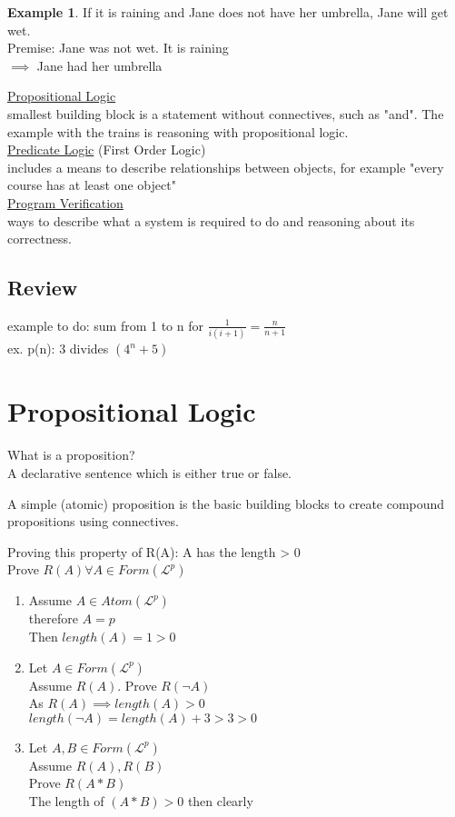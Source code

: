\documentclass[12pt,oneside,notitlepage]{book}
\theoremstyle{definition}
\newtheorem{ex}{Example}[subsection]
\newcommand{\Lp}{\mathcal{L}^p}
\begin{document}
\begin{ex}
If it is raining and Jane does not have her umbrella, Jane will get wet. \\
Premise: Jane was not wet. It is raining \\
$\implies$ Jane had her umbrella
\end{ex}

\underline{Propositional Logic} \\
smallest building block is a statement without connectives, such as "and". The example with the trains is reasoning with propositional logic. \\
\underline{Predicate Logic} (First Order Logic) \\
includes a means to describe relationships between objects, for example "every course has at least one object" \\
\underline{Program Verification} \\
ways to describe what a system is required to do and reasoning about its correctness. \\

\subsection{Review}
example to do:
sum from 1 to n for $ \frac{1}{i(i+1)} = \frac{n}{ n+1}$ \\
ex. p(n): 3 divides $(4^n + 5)$

\section{Propositional Logic}
What is a proposition? \\
A declarative sentence which is either true or false.

A simple (atomic) proposition is the basic building blocks to create compound propositions using connectives.

Proving this property of R(A): A has the length > 0 \\
Prove $R(A) \forall A \in Form(\Lp)$
\begin{enumerate}
\item Assume $A \in Atom(\Lp)$ \\
therefore $A = p$ \\
Then $length(A) = 1 > 0$ \\
\item Let $A \in Form(\Lp)$ \\
Assume $R(A)$. Prove $R(\neg A)$ \\
As $R(A) \implies length(A) > 0$ \\
$length(\neg A) = length(A) + 3 > 3 > 0$ \\
\item Let $A, B \in Form(\Lp)$ \\
Assume $R(A), R(B)$ \\
Prove $R(A * B)$ \\
The length of $(A * B) > 0$ then clearly
\end{enumerate}
\end{document}
